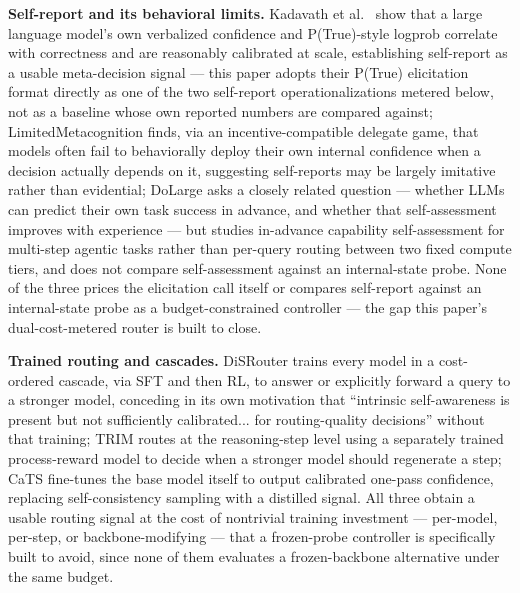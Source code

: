 \documentclass[11pt]{article}
\begin{document}
\textbf{Self-report and its behavioral limits.} Kadavath et al.\ \citep{Kadavath2207} show that a large language model's own verbalized confidence and P(True)-style logprob correlate with correctness and are reasonably calibrated at scale, establishing self-report as a usable meta-decision signal --- this paper adopts their P(True) elicitation format directly as one of the two self-report operationalizations metered below, not as a baseline whose own reported numbers are compared against; LimitedMetacognition \citep{LimitedMetacoggb9} finds, via an incentive-compatible delegate game, that models often fail to behaviorally deploy their own internal confidence when a decision actually depends on it, suggesting self-reports may be largely imitative rather than evidential; DoLarge \citep{DoLarge4661} asks a closely related question --- whether LLMs can predict their own task success in advance, and whether that self-assessment improves with experience --- but studies in-advance capability self-assessment for multi-step agentic tasks rather than per-query routing between two fixed compute tiers, and does not compare self-assessment against an internal-state probe. None of the three prices the elicitation call itself or compares self-report against an internal-state probe as a budget-constrained controller --- the gap this paper's dual-cost-metered router is built to close.

\textbf{Trained routing and cascades.} DiSRouter \citep{DiSRouterKDcw} trains every model in a cost-ordered cascade, via SFT and then RL, to answer or explicitly forward a query to a stronger model, conceding in its own motivation that ``intrinsic self-awareness is present but not sufficiently calibrated... for routing-quality decisions'' without that training; TRIM \citep{TRIMMoKr} routes at the reasoning-step level using a separately trained process-reward model to decide when a stronger model should regenerate a step; CaTS \citep{CaTSjrSc} fine-tunes the base model itself to output calibrated one-pass confidence, replacing self-consistency sampling with a distilled signal. All three obtain a usable routing signal at the cost of nontrivial training investment --- per-model, per-step, or backbone-modifying --- that a frozen-probe controller is specifically built to avoid, since none of them evaluates a frozen-backbone alternative under the same budget.
\end{document}
